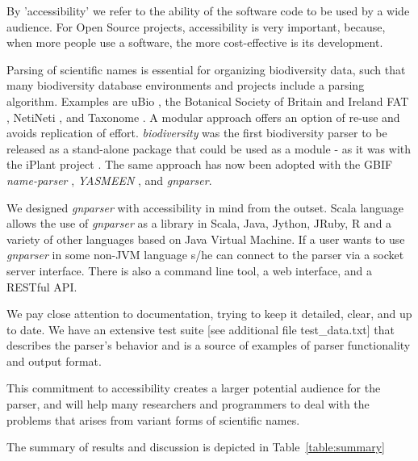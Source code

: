 \documentclass{bmcart}
\begin{document}
By 'accessibility' we refer to the ability of the software code to be used by a wide
audience. For Open Source projects, accessibility is very important, because, when more people use a software, the more cost-effective is its development.

Parsing of scientific names is essential for organizing biodiversity data, such that many biodiversity database environments and projects include a parsing algorithm.  Examples
are uBio \cite{ubio:parser}, the Botanical Society of Britain and Ireland
\cite{botsociety:parser} FAT \cite{Sautter2006}, NetiNeti \cite{Akella2012}, and Taxonome \cite{Kluyver2013}. A modular approach offers an option of re-use and avoids replication of effort. \textit{biodiversity} was the first biodiversity parser to be released as a stand-alone package that could be used as a module - as it was with the iPlant project \cite{Boyle2013}. The same approach has now been adopted with the GBIF \textit{name-parser}
\cite{gbifNameParser}, \textit{YASMEEN} \cite{VandenBerghe2015}, and
\textit{gnparser}.

We designed \textit{gnparser} with accessibility in mind from the outset. Scala
language allows the use of \textit{gnparser} as a library in Scala, Java,
Jython, JRuby, R and a variety of other languages based on
Java Virtual Machine. If a user wants to use \textit{gnparser}  in some non-JVM
language s/he can connect to the parser via a socket server interface. There is
also a command line tool, a web interface, and a RESTful API.

We pay close attention to documentation, trying to keep it detailed, clear, and
up to date. We have an extensive test suite [see additional file test\_data.txt] that describes the parser's behavior
and is a source of examples of parser functionality and output
format.

This commitment to accessibility creates a larger potential audience for the parser, and will help
many researchers and programmers to deal with the problems that arises from variant forms of scientific names.

The summary of results and discussion is depicted in
Table~\ref{table:summary}
\end{document}

